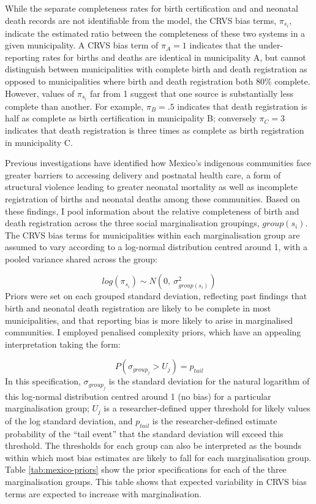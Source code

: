\documentclass[
]{report}
\begin{document}
While the separate completeness rates for birth certification and and neonatal death records are not identifiable from the model, the CRVS bias terms, \(\pi_{s_i}\), indicate the estimated ratio between the completeness of these two systems in a given municipality. A CRVS bias term of \(\pi_{A}=1\) indicates that the under-reporting rates for births and deaths are identical in municipality A, but cannot distinguish between municipalities with complete birth and death registration as opposed to municipalities where birth and death registration both 80\% complete. However, values of \(\pi_{s_i}\) far from 1 suggest that one source is substantially less complete than another. For example, \(\pi_B=.5\) indicates that death registration is half as complete as birth certification in municipality B; conversely \(\pi_C=3\) indicates that death registration is three times as complete as birth registration in municipality C.

Previous investigations have identified how Mexico's indigenous communities face greater barriers to accessing delivery and postnatal health care, a form of structural violence leading to greater neonatal mortality as well as incomplete registration of births and neonatal deaths among these communities.\autocite{Gamlin2020,Enciso2017,Paulino2019} Based on these findings, I pool information about the relative completeness of birth and death registration across the three social marginalisation groupings, \(group(s_i)\). The CRVS bias terms for municipalities within each marginalisation group are assumed to vary according to a log-normal distribution centred around 1, with a pooled variance shared across the group:

\[log(\pi_{s_i}) \sim N(0,~\sigma^2_{group(s_i)})\]
Priors were set on each grouped standard deviation, reflecting past findings that birth and neonatal death registration are likely to be complete in most municipalities, and that reporting bias is more likely to arise in marginalised communities.\autocite{Dicker2018,Hernandez2012,Gamlin2020,Enciso2017,Luis2014} I employed penalised complexity priors, which have an appealing interpretation taking the form:

\[P(\sigma_{group_j} > U_j) = p_{tail}\]
In this specification, \(\sigma_{group_j}\) is the standard deviation for the natural logarithm of this log-normal distribution centred around 1 (no bias) for a particular marginalisation group; \(U_j\) is a researcher-defined upper threshold for likely values of the log standard deviation, and \(p_{tail}\) is the researcher-defined estimate probability of the ``tail event'' that the standard deviation will exceed this threshold.\autocite{Simpson2017} The thresholds for each group can also be interpreted as the bounds within which most bias estimates are likely to fall for each marginalisation group. Table \ref{tab:mexico-priors} show the prior specifications for each of the three marginalisation groups. This table shows that expected variability in CRVS bias terms are expected to increase with marginalisation.
\end{document}
